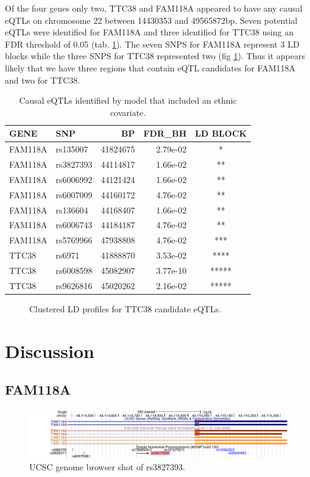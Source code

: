 \documentclass[12pt,a4paper]{article}
\begin{document}
Of the four genes only two, TTC38 and FAM118A appeared to have any causal eQTLs on chromosome 22 between 14430353 and 49565872bp. Seven potential eQTLs were identified for FAM118A and three identified for TTC38 using an FDR threshold of 0.05 (tab. \ref{eQTL_tab}). The seven SNPS for FAM118A represent 3 LD blocks while the three SNPS for TTC38 represented two (fig \ref{fig:LD}). Thus it appears likely that we have three regions that contain eQTL candidates for FAM118A and two for TTC38.   

\begin{table}
\centering
\begin{tabular}{llrrc}
  \hline
GENE & SNP & BP & FDR\_BH & LD BLOCK\\ 
  \hline
  FAM118A & rs135007 & 41824675 & 2.79e-02 & * \\ 
  FAM118A & rs3827393 & 44114817 & 1.66e-02 & ** \\ 
  FAM118A & rs6006992 & 44121424 & 1.66e-02  & ** \\ 
  FAM118A & rs6007009 & 44160172 & 4.76e-02 & ** \\ 
  FAM118A & rs136604 & 44168407 & 1.66e-02 & ** \\ 
  FAM118A & rs6006743 & 44184187 & 4.76e-02 & ** \\ 
  FAM118A & rs5769966 & 47938808 & 4.76e-02  & *** \\ \hline
  TTC38 & rs6971 & 41888870 & 3.53e-02  & ****  \\ 
  TTC38 & rs6008598 & 45082907 & 3.77e-10  & ***** \\ 
  TTC38 & rs9626816 & 45020262 & 2.16e-02  & ***** \\ 
   \hline
\end{tabular}
\caption[eQTL]{Causal eQTLs identified by model that included an ethnic covariate.}
\label{eQTL_tab}
\end{table}

\begin{figure}
\centering
{}\hfill
{}\hfill
\caption{Clustered LD profiles for TTC38 candidate eQTLs.}
\label{fig:LD}
\end{figure}

\section{Discussion}
\subsection{FAM118A}
\begin{figure}
\centering
\includegraphics[width=1\linewidth]{./hgt_genome_28d3_4cda30}
\caption{UCSC genome browser shot of rs3827393.}
\label{fig:hgt_genome_28d3_4cda30}
\end{figure}
\end{document}
